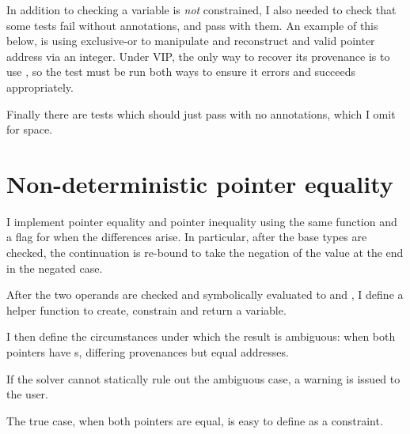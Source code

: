 
In addition to checking a variable is \emph{not} constrained, I also needed to
check that some tests fail without  annotations, and
pass with them. An example of this below, is using exclusive-or to manipulate
and reconstruct and valid pointer address via an integer. Under VIP, the only
way to recover its provenance is to use , so the test
must be run both ways to ensure it errors and succeeds appropriately.


Finally there are tests which should just pass with no annotations, which I
omit for space.

\section{Non-deterministic pointer equality}

I implement pointer equality and pointer inequality using the same function and
a flag for when the differences arise. In particular, after the base types are
checked, the continuation is re-bound to take the negation of the value at the
end in the negated case.


After the two operands are checked and symbolically evaluated to
 and , I define a helper function to create,
constrain and return a variable.


I then define the circumstances under which the result is ambiguous: when both
pointers have s, differing provenances but equal addresses.


If the solver cannot statically rule out the ambiguous case, a warning is
issued to the user.


The true case, when both pointers are equal, is easy to define as a constraint.


